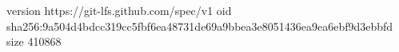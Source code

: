 version https://git-lfs.github.com/spec/v1
oid sha256:9a504d4bdcc319cc5fbf6ea48731de69a9bbea3e8051436ea9ea6ebf9d3ebbfd
size 410868
